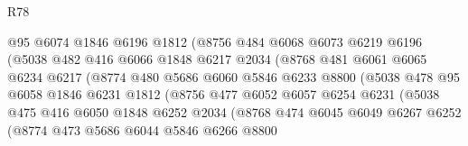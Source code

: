 \begin{lexlean}{R78}
\begin{coremodule}
                          @95
                          @6074
                          @1846
                          @6196
                          @1812
                          (@8756
                            @484
                            @6068
                            @6073
                            @6219
                            @6196
                            (@5038
                              @482
                              @416
                              @6066
                              @1848
                              @6217
                              @2034
                              (@8768
                                @481
                                @6061
                                @6065
                                @6234
                                @6217
                                (@8774
                                  @480
                                  @5686
                                  @6060
                                  @5846
                                  @6233
                                  @8800
                                  (@5038
                                    @478
                                    @95
                                    @6058
                                    @1846
                                    @6231
                                    @1812
                                    (@8756
                                      @477
                                      @6052
                                      @6057
                                      @6254
                                      @6231
                                      (@5038
                                        @475
                                        @416
                                        @6050
                                        @1848
                                        @6252
                                        @2034
                                        (@8768
                                          @474
                                          @6045
                                          @6049
                                          @6267
                                          @6252
                                          (@8774
                                            @473
                                            @5686
                                            @6044
                                            @5846
                                            @6266
                                            @8800

\end{coremodule}
\end{lexlean}
